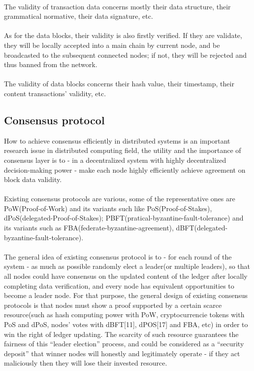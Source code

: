 \documentclass[]{article}
\begin{document}
\begin{CJK*}{UTF8}{gbsn}
\paragraph{} The validity of transaction data concerns mostly their data structure, their grammatical normative, their data signature, etc. 
\paragraph{} As for the data blocks, their validity is also firstly verified. If they are validate, they will be locally accepted into a main chain by current node, and be broadcasted to the subsequent connected nodes; if not, they will be rejected and thus banned from the network.
\paragraph{} The validity of data blocks concerns their hash value, their timestamp, their content transactions' validity, etc.
\subsection{Consensus protocol}
How to achieve consensus efficiently in distributed systems is an important research issue in distributed computing field, the utility and the importance of consensus layer is to - in a decentralized system with highly decentralized decision-making power - make each node highly efficiently achieve agreement on block data validity.
\paragraph{} Existing consensus protocols are various, some of the representative ones are PoW(Proof-of-Work) and its variants such like PoS(Proof-of-Stakes), dPoS(delegated-Proof-of-Stakes); PBFT(pratical-byzantine-fault-tolerance) and its variants such as FBA(federate-byzantine-agreement), dBFT(delegated-byzantine-fault-tolerance). 
\paragraph{} The general idea of existing consensus protocol is to - for each round of the system - as much as possible randomly elect a leader(or multiple leaders), so that all nodes could have consensus on the updated content of the ledger after locally completing data verification, and every node has equivalent opportunities to become a leader node. For that purpose, the general design of existing consensus protocols is that nodes must show a proof supported by a certain scarce resource(such as hash computing power with PoW, cryptocurrencie tokens with PoS and dPoS, nodes' votes with dBFT[11], dPOS[17] and FBA, etc) in order to win the right of ledger updating. The scarcity of such resource guarantees the fairness of this ``leader election'' process, and could be considered as a ``security deposit'' that winner nodes will honestly and legitimately operate - if they act maliciously then they will lose their invested resource.

\end{CJK*}
\end{document}
